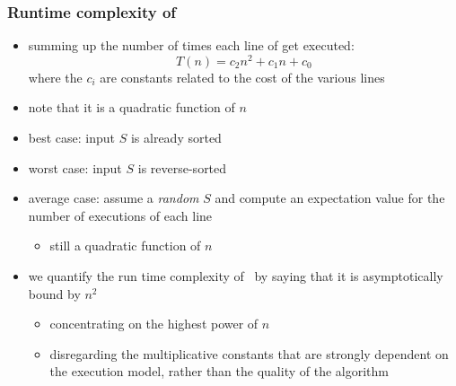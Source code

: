\begin{frame}[fragile]
%
  \frametitle{Runtime complexity of \insertionsort}
%
  \begin{itemize}
%
  \item summing up the number of times each line of  get executed:
    \[ T(n) = c_{2} n^{2} + c_{1} n + c_{0} \]
    where the $c_{i}$ are constants related to the cost of the various lines
  \item note that it is a quadratic function of $n$
  \item best case: input $S$ is already sorted
  \item worst case: input $S$ is reverse-sorted
  \item average case: assume a {\em random} $S$ and compute an expectation value for the number
    of executions of each line
    \begin{itemize}
    \item still a quadratic function of $n$
    \end{itemize}
  \item we quantify the run time complexity of \insertionsort\ by saying that it is
    asymptotically bound by $n^2$
    \begin{itemize}
      \item concentrating on the highest power of $n$
      \item disregarding the multiplicative constants that are strongly dependent on the
        execution model, rather than the quality of the algorithm
    \end{itemize}
%
  \end{itemize}
%
\end{frame}

